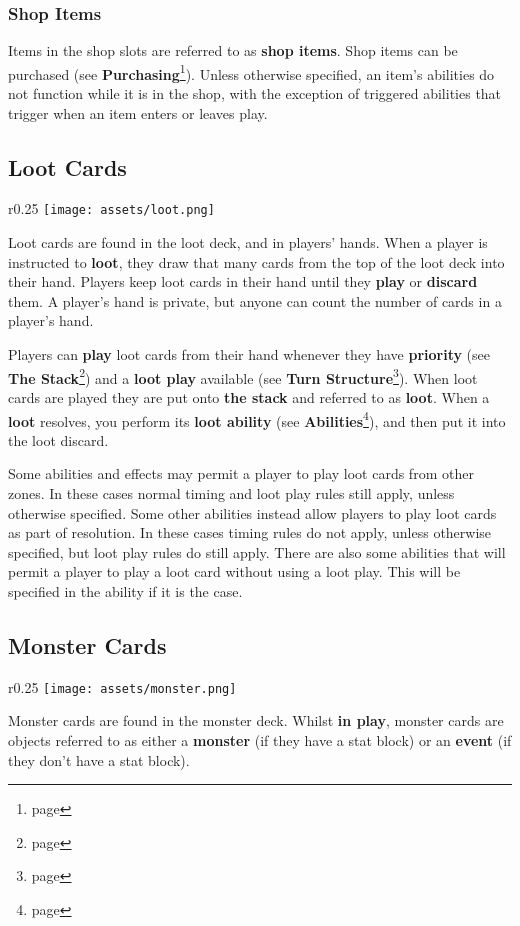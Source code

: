 \documentclass[10pt, a4paper, twoside]{article} %
\begin{document}
    \subsubsection{Shop Items}
    Items in the shop slots are referred to as \textbf{shop items}. Shop items can be purchased (see \textbf{Purchasing}\footnote{page \pageref{purchasing}}). Unless otherwise specified, an item’s abilities do not function while it is in the shop, with the exception of triggered abilities that trigger when an item enters or leaves play.

    \subsection{Loot Cards}
    \begin{wrapfigure}{r}{0.25\textwidth}
        \centering
        \texttt{[image: assets/loot.png]}
    \end{wrapfigure}
    Loot cards are found in the loot deck, and in players’ hands. When a player is instructed to \textbf{loot}, they draw that many cards from the top of the loot deck into their hand. Players keep loot cards in their hand until they \textbf{play} or \textbf{discard} them. A player’s hand is private, but anyone can count the number of cards in a player’s hand.

    Players can \textbf{play} loot cards from their hand whenever they have \textbf{priority} (see \textbf{The Stack}\footnote{page \pageref{stack}}) and a \textbf{loot play} available (see \textbf{Turn Structure}\footnote{page \pageref{turn}}). When loot cards are played they are put onto \textbf{the stack} and referred to as \textbf{loot}. When a \textbf{loot} resolves, you perform its \textbf{loot ability} (see \textbf{Abilities}\footnote{page \pageref{abilities}}), and then put it into the loot discard.

    Some abilities and effects may permit a player to play loot cards from other zones. In these cases normal timing and loot play rules still apply, unless otherwise specified. Some other abilities instead allow players to play loot cards as part of resolution. In these cases timing rules do not apply, unless otherwise specified, but loot play rules do still apply. There are also some abilities that will permit a player to play a loot card without using a loot play. This will be specified in the ability if it is the case.

    \subsection{Monster Cards}
    \begin{wrapfigure}{r}{0.25\textwidth}
        \centering
        \texttt{[image: assets/monster.png]}
    \end{wrapfigure}
    Monster cards are found in the monster deck. Whilst \textbf{in play}, monster cards are objects referred to as either a \textbf{monster} (if they have a stat block) or an \textbf{event} (if they don’t have a stat block).
\end{document}

